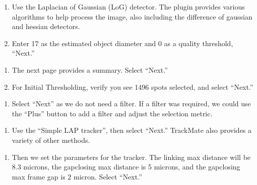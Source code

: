 \documentclass[letterpaper,10pt,english]{jupyterBook}
\begin{document}
\sphinxAtStartPar
{}
\begin{enumerate}
%
\setcounter{enumi}{2}
\item {} 
\sphinxAtStartPar
Use the Laplacian of Gaussian (LoG) detector. The plugin provides various algorithms to help process the image, also including the difference of gaussian and hessian detectors.

\item {} 
\sphinxAtStartPar
Enter 17 as the estimated object diameter and 0 as a quality threshold, “Next.”

\end{enumerate}

\sphinxAtStartPar
{}
\begin{enumerate}
%
\setcounter{enumi}{4}
\item {} 
\sphinxAtStartPar
The next page provides a summary. Select “Next.”

\item {} 
\sphinxAtStartPar
For Initial Thresholding, verify you see 1496 spots selected, and select “Next.”

\end{enumerate}

\sphinxAtStartPar
{}
\begin{enumerate}
%
\setcounter{enumi}{6}
\item {} 
\sphinxAtStartPar
Select “Next” as we do not need a filter. If a filter was required, we could use the “Plus” button to add a filter and adjust the selection metric.

\end{enumerate}

\sphinxAtStartPar
{}
\begin{enumerate}
%
\setcounter{enumi}{7}
\item {} 
\sphinxAtStartPar
Use the “Simple LAP tracker”, then select “Next.” TrackMate also provides a variety of other methods.

\end{enumerate}

\sphinxAtStartPar
{}
\begin{enumerate}
%
\setcounter{enumi}{8}
\item {} 
\sphinxAtStartPar
Then we set the parameters for the tracker. The linking max distance will be 8.3 microns, the gap\sphinxhyphen{}closing max distance is 5 microns, and the gap\sphinxhyphen{}closing max frame gap is 2 micron. Select “Next.”

\end{enumerate}
\end{document}
